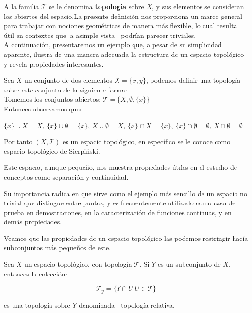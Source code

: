 A la familia $\mathcal{T}$ se le denomina \textbf{topología} sobre $X$, y sus elementos se consideran los abiertos del espacio.La presente definición nos  proporciona un marco general para trabajar con nociones geométricas de manera más flexible, lo cual resulta útil en contextos que, a asimple vista , podrían parecer triviales.
\\A continuación, presentaremos un ejemplo que, a pesar de su simplicidad aparente, ilustra de una manera adecuada la estructura de un espacio topológico y revela propiedades interesantes.

\begin{example}
    Sea $X$ un conjunto de dos elementos $X = \{x,y\}$, podemos definir una topología sobre este conjunto de la siguiente forma:
    \\Tomemos los conjuntos abiertos: $\mathcal{T} = \{X,\emptyset, \{x\} \}$
    \\Entonces observamos que:
    
    $\{x\} \cup X =X$, $\{x\} \cup \emptyset = \{x\}$,
    $X \cup \emptyset = X$, $\{x\} \cap X = \{x\}$,
    $\{x\} \cap \emptyset = \emptyset$, $X \cap \emptyset = \emptyset$
    
    Por tanto $(X,\mathcal{T})$ es un espacio topológico, en específico se le conoce como espacio topológico de Sierpiński.
    
\end{example}

Este espacio, aunque pequeño, nos muestra propiedades útiles en el estudio de conceptos como separación y continuidad.

Su importancia radica en que sirve como el ejemplo más sencillo de un espacio no trivial que distingue entre puntos, y es frecuentemente utilizado como caso de prueba en demostraciones, en la caracterización de funciones continuas, y en demás propiedades.

Veamos que las propiedades de un espacio topológico las podemos restringir hacía subconjuntos más pequeños de este.

\begin{definition}
    Sea $X$ un espacio topológico, con topología $\mathcal{T}$. Si $Y$ es un subconjunto de $X$, entonces la colección:

    \[
    \mathcal{T}_y = \{ Y \cap U | U \in \mathcal{T}\}
    \]

    es una topología sobre $Y$ denominada , topología relativa.
    
\end{definition}

